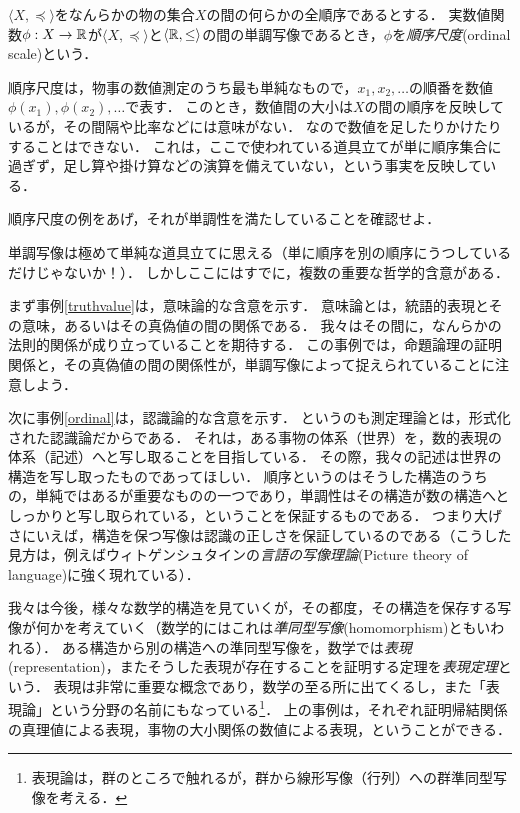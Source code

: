 \documentclass[dvipdfmx,11pt,a4paper]{jsarticle}
\begin{document}
\begin{example}[測定理論] \label{ordinal}
$\langle X, \preceq \rangle$をなんらかの物の集合$X$の間の何らかの全順序であるとする．
実数値関数$\phi:X \to \mathbb{R}$が$\langle X, \preceq \rangle$と$\langle \mathbb{R}, \leq \rangle$の間の単調写像であるとき，$\phi$を\emph{順序尺度}(ordinal scale)という．

順序尺度は，物事の数値測定のうち最も単純なもので，$x_1, x_2, \dots$の順番を数値$\phi(x_1), \phi(x_2), \dots$で表す．
このとき，数値間の大小は$X$の間の順序を反映しているが，その間隔や比率などには意味がない．
なので数値を足したりかけたりすることはできない．
これは，ここで使われている道具立てが単に順序集合に過ぎず，足し算や掛け算などの演算を備えていない，という事実を反映している．
\end{example}

\begin{exercise}
 順序尺度の例をあげ，それが単調性を満たしていることを確認せよ．
\end{exercise}

単調写像は極めて単純な道具立てに思える（単に順序を別の順序にうつしているだけじゃないか！）．
しかしここにはすでに，複数の重要な哲学的含意がある．

まず事例\ref{truthvalue}は，意味論的な含意を示す．
意味論とは，統語的表現とその意味，あるいはその真偽値の間の関係である．
我々はその間に，なんらかの法則的関係が成り立っていることを期待する．
この事例では，命題論理の証明関係と，その真偽値の間の関係性が，単調写像によって捉えられていることに注意しよう．

次に事例\ref{ordinal}は，認識論的な含意を示す．
というのも測定理論とは，形式化された認識論だからである．
それは，ある事物の体系（世界）を，数的表現の体系（記述）へと写し取ることを目指している．
その際，我々の記述は世界の構造を写し取ったものであってほしい．
順序というのはそうした構造のうちの，単純ではあるが重要なものの一つであり，単調性はその構造が数の構造へとしっかりと写し取られている，ということを保証するものである．
つまり大げさにいえば，構造を保つ写像は認識の正しさを保証しているのである（こうした見方は，例えばウィトゲンシュタインの\emph{言語の写像理論}(Picture theory of language)に強く現れている）．

我々は今後，様々な数学的構造を見ていくが，その都度，その構造を保存する写像が何かを考えていく（数学的にはこれは\emph{準同型写像}(homomorphism)ともいわれる）．
ある構造から別の構造への準同型写像を，数学では\emph{表現}(representation)，またそうした表現が存在することを証明する定理を\emph{表現定理}という．
表現は非常に重要な概念であり，数学の至る所に出てくるし，また「表現論」という分野の名前にもなっている\footnote{表現論は，群のところで触れるが，群から線形写像（行列）への群準同型写像を考える．}．
上の事例は，それぞれ証明帰結関係の真理値による表現，事物の大小関係の数値による表現，ということができる．
\end{document}
